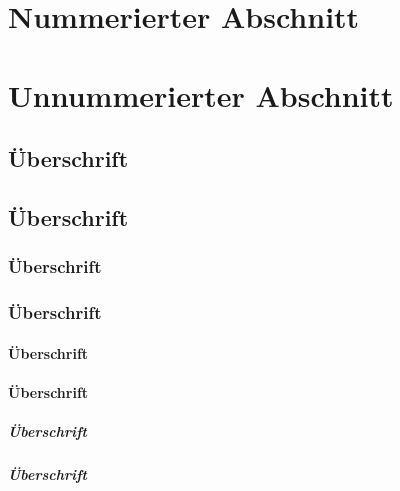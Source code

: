 \documentclass[ngerman,%
cd=full,%
tudscrver=2.05,%
cdoldfont=onlydin,
chapterprefix=true,
]{tudscrreprt}
\begin{document}
\meaning\endtrivlist

\section{Nummerierter Abschnitt}
\section*{Unnummerierter Abschnitt}

\subsection{Überschrift}
\subsection*{Überschrift}
\subsubsection{Überschrift}
\subsubsection*{Überschrift}
\paragraph{Überschrift}
\paragraph*{Überschrift}
\subparagraph{Überschrift}
\subparagraph*{Überschrift}
\end{document}
